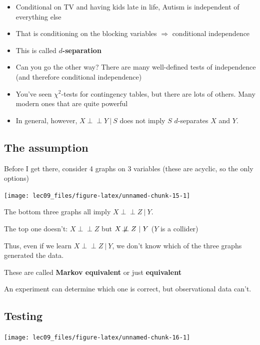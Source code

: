 \documentclass[]{article}
\begin{document}
\begin{itemize}
\item
  Conditional on TV and having kids late in life, Autism is independent
  of everything else
\item
  That is conditioning on the blocking variables \(\Rightarrow\)
  conditional independence
\item
  This is called \textbf{\(d\)-separation}
\item
  Can you go the other way? There are many well-defined tests of
  independence (and therefore conditional independence)
\item
  You've seen \(\chi^2\)-tests for contingency tables, but there are
  lots of others. Many modern ones that are quite powerful
\item
  In general, however, \(X \perp\!\!\!\perp Y \ \vert\ S\) does not
  imply \(S\) \(d\)-separates \(X\) and \(Y\).
\end{itemize}

\hypertarget{the-assumption}{%
\subsection{The assumption}\label{the-assumption}}

Before I get there, consider 4 graphs on 3 variables (these are acyclic,
so the only options)

\begin{center}\texttt{[image: lec09\_files/figure-latex/unnamed-chunk-15-1]} \end{center}

The bottom three graphs all imply \(X \perp\!\!\!\perp Z \ \vert\ Y\).

The top one doesn't: \(X \perp\!\!\!\perp Z\) but
\(X \not\!\perp\!\!\!\perp Z \ \vert\ Y\) (\(Y\) is a collider)

Thus, even if we learn \(X \perp\!\!\!\perp Z \ \vert\ Y\), we don't
know which of the three graphs generated the data.

These are called \textbf{Markov equivalent} or just \textbf{equivalent}

An experiment can determine which one is correct, but observational data
can't.

\hypertarget{testing}{%
\subsection{Testing}\label{testing}}

\begin{center}\texttt{[image: lec09\_files/figure-latex/unnamed-chunk-16-1]} \end{center}
\end{document}
